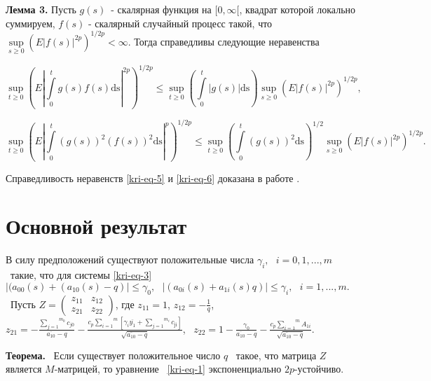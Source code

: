 \textbf{Лемма 3.} Пусть  $g(s)$\ {}- скалярная функция на  $[0,\infty [$, квадрат которой локально суммируем,
$f(s)$ {}- скалярный случайный процесс такой, что  $\underset{s\ge 0} \sup \left(E|f(s)|^{2p}\right)^{1/2p} <\infty $. Тогда справедливы следующие неравенства

\begin{equation}\label{kri-eq-5}
	\underset{t\ge 0}\sup\left(E|\overset t{\underset 0{\int
	}}g(s)f(s)\text{ds}|^{2p}\right)^{1/2p}\le \underset{t\ge 0}\sup\left(\overset t{\underset
		0{\int }}|g(s)|\text{ds}\right)\underset{s\ge
		0}\sup\left(E|f(s)|^{2p}\right)^{1/2p},
\end{equation}

\begin{equation}\label{kri-eq-6}
	\underset{t\ge 0}\sup\left(E|\overset t{\underset 0{\int
	}}(g(s))^2(f(s))^2\text{ds}|^p\right)^{1/2p}\le \underset{t\ge 0}\sup\left(\overset
	t{\underset 0{\int }}(g(s))^2\text{ds}\right)^{1/2}\underset{s\ge
		0}\sup\left(E|f(s)|^{2p}\right)^{1/2p}.
\end{equation}

Справедливость неравенств \eqref{kri-eq-5} и \eqref{kri-eq-6} доказана в работе \cite{kri-bib-21}.

\section{Основной результат}

В силу предположений существуют положительные числа  $\gamma _i,\text{  }i=0,1,...,m$ \ такие, что для системы \eqref{kri-eq-3}
$|(a_{00}(s)+(a_{10}(s)-q)|\le \gamma _0,\text{  }|(a_{0i}(s)+a_{1i}(s)q)|\le \gamma _i,\text{  }i=1,...,m.$ \ Пусть
$Z=\left(\begin{matrix}z_{11}&z_{12}\\z_{21}&z_{22}\end{matrix}\right)$, где  $z_{11}=1$,  $z_{12}=-\frac 1 q$,
$z_{21}=-\frac{\overset{m_0}{\underset{j=1}{\sum }}c_{\mathit{j0}}}{\overline{a_{10}}-q}-\frac{c_p\overset
m{\underset{i=1}{\sum }}\left[\gamma _i\overline{y_1}+\overset{m_i}{\underset{j=1}{\sum
}}c_{\text{ji}}\right]}{\sqrt{\overline{a_{10}}-q}}$, \  $z_{22}=1-\frac{\gamma
_0}{\overline{a_{10}}-q}-\frac{c_p\overset m{\underset{i=1}{\sum }}A_{1i}}{\sqrt{\overline{a_{10}}-q}}.$

\textbf{Теорема.} \ Если существует положительное число  $q$ \ такое, что матрица  $Z$ является  $M${}-матрицей, то
уравнение \ \eqref{kri-eq-1} экспоненциально  $2p${}-устойчиво.

